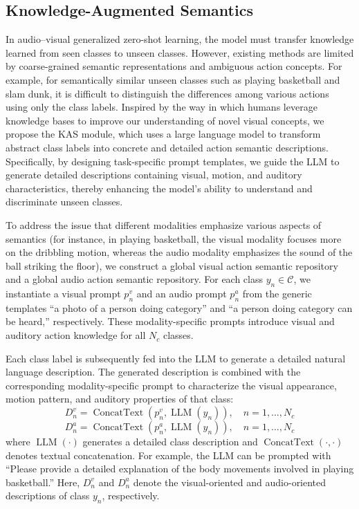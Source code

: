 \documentclass[lettersize,journal]{IEEEtran}
\begin{document}
\subsection{Knowledge-Augmented Semantics}
In audio–visual generalized zero-shot learning, the model must transfer knowledge learned from seen classes to unseen classes. However, existing methods are limited by coarse-grained semantic representations and ambiguous action concepts. For example, for semantically similar unseen classes such as playing basketball and slam dunk, it is difficult to distinguish the differences among various actions using only the class labels. Inspired by the way in which humans leverage knowledge bases to improve our understanding of novel visual concepts, we propose the KAS module, which uses a large language model to transform abstract class labels into concrete and detailed action semantic descriptions. Specifically, by designing task-specific prompt templates, we guide the LLM to generate detailed descriptions containing visual, motion, and auditory characteristics, thereby enhancing the model’s ability to understand and discriminate unseen classes.


To address the issue that different modalities emphasize various aspects of semantics (for instance, in playing basketball, the visual modality focuses more on the dribbling motion, whereas the audio modality emphasizes the sound of the ball striking the floor), we construct a global visual action semantic repository and a global audio action semantic repository. For each class $y_n\in\mathcal{C}$, we instantiate a visual prompt $p_n^v$ and an audio prompt $p_n^a$ from the generic templates “a photo of a person doing {category}” and “a person doing {category} can be heard,” respectively. These modality-specific prompts introduce visual and auditory action knowledge for all $N_c$ classes.


Each class label is subsequently fed into the LLM to generate a detailed natural language description. The generated description is combined with the corresponding modality-specific prompt to characterize the visual appearance, motion pattern, and auditory properties of that class:
\begin{equation}
D_n^v=\operatorname{ConcatText}\left(p_n^v,\operatorname{LLM}(y_n)\right),\quad n=1,\ldots,N_c
\end{equation}
\begin{equation}
D_n^a=\operatorname{ConcatText}\left(p_n^a,\operatorname{LLM}(y_n)\right),\quad n=1,\ldots,N_c
\end{equation}
where $\operatorname{LLM}(\cdot)$ generates a detailed class description and $\operatorname{ConcatText}(\cdot,\cdot)$ denotes textual concatenation. For example, the LLM can be prompted with “Please provide a detailed explanation of the body movements involved in playing basketball.” Here, $D_n^v$ and $D_n^a$ denote the visual-oriented and audio-oriented descriptions of class $y_n$, respectively.
\end{document}
